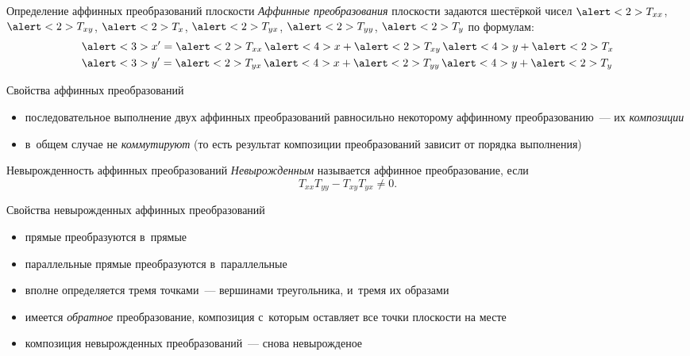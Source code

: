 	{}


\begin{frame}{Определение аффинных преобразований плоскости}
\emph{Аффинные преобразования} плоскости задаются шестёркой чисел $\alert<2>{T_{xx}}$,
$\alert<2>{T_{xy}}$, $\alert<2>{T_x}$, $\alert<2>{T_{yx}}$,
$\alert<2>{T_{yy}}$, $\alert<2>{T_y}$ по формулам:
{\LARGE
	\[
	\begin{aligned}
	&\alert<3>{x'}=\alert<2>{T_{xx}}\,\alert<4>{x}+\alert<2>{T_{xy}}\,\alert<4>{y}+\alert<2>{T_x}\\
	&\alert<3>{y'}=\alert<2>{T_{yx}}\,\alert<4>{x}+\alert<2>{T_{yy}}\,\alert<4>{y}+\alert<2>{T_y}
	\end{aligned}
	\]}

\end{frame}


\begin{frame}{Свойства аффинных преобразований}
\begin{itemize}
\item
последовательное выполнение двух аффинных преобразований равносильно некоторому
аффинному преобразованию~— их \emph{композиции}
\item
в~общем случае не \emph{коммутируют} (то есть результат композиции
преобразований зависит от порядка выполнения)
\end{itemize}
\end{frame}


\begin{frame}{Невырожденность аффинных преобразований}
\emph{Невырожденным} называется аффинное преобразование, если
{\LARGE
	\[
	T_{xx}T_{yy}-T_{xy}T_{yx}\ne0.
	\]}
\end{frame}


\begin{frame}{Свойства невырожденных аффинных преобразований}
\begin{itemize}
\item
прямые преобразуются в~прямые
\item
параллельные прямые преобразуются в~параллельные
\item
вполне определяется тремя точками~— вершинами треугольника, и~тремя их образами
\item
имеется \emph{обратное} преобразование, композиция с~которым оставляет все
точки плоскости на месте
\item
композиция невырожденных преобразований~— снова невырожденое
\end{itemize}
\end{frame}

